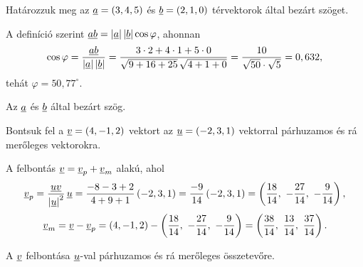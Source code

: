 \documentclass[11pt]{article}
\begin{document}
\begin{exbox}
\begin{example}
Határozzuk meg az $\underline{a}=(3, 4, 5)$ és $\underline{b}=(2, 1, 0)$ térvektorok által bezárt szöget.
\end{example}
\end{exbox}
\begin{solution}
A definíció szerint $\underline{a}\underline{b}=\left|\underline{a}\right|\left|\underline{b}\right|\cos\varphi$, ahonnan
\[
\cos\varphi=\frac{\underline{a}\underline{b}}{\left|\underline{a}\right|\left|\underline{b}\right|}
=\frac{3\cdot 2+4\cdot 1+5\cdot 0}{\sqrt{9+16+25}\,\sqrt{4+1+0}}
=\frac{10}{\sqrt{50}\cdot\sqrt{5}}=0,632,
\]
tehát $\varphi=50,77^{\circ}$.

\begin{notefig}{Az $\underline{a}$ és $\underline{b}$ által bezárt szög.}
\end{notefig}
\end{solution}

\begin{exbox}
\begin{example}
Bontsuk fel a $\underline{v}=(4, -1, 2)$ vektort az $\underline{u}=(-2, 3, 1)$ vektorral párhuzamos és rá merőleges vektorokra.
\end{example}
\end{exbox}
\begin{solution}
A felbontás $\underline{v}=\underline{v}_{p}+\underline{v}_{m}$ alakú, ahol
\[
\underline{v}_{p}=\frac{\underline{u}\underline{v}}{\left|\underline{u}\right|^{2}}\,\underline{u}
=\frac{-8-3+2}{4+9+1}\,(-2, 3, 1)
=\frac{-9}{14}\,(-2, 3, 1)
=\left(\frac{18}{14},\ -\frac{27}{14},\ -\frac{9}{14}\right),
\]
\[
\vect v_{m}=\vect v-\vect v_{p}=(4, -1, 2)-\left(\frac{18}{14},\ -\frac{27}{14},\ -\frac{9}{14}\right)
=\left(\frac{38}{14},\ \frac{13}{14},\ \frac{37}{14}\right).
\]

\begin{notefig}{A $\underline{v}$ felbontása $\underline{u}$-val párhuzamos és rá merőleges összetevőre.}
\end{notefig}
\end{solution}
\end{document}
